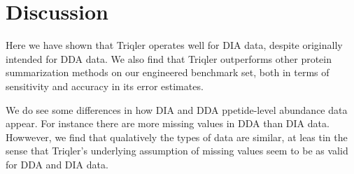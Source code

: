 \documentclass[10pt,letterpaper]{article}
\begin{document}

\section*{Discussion}

Here we have shown that Triqler operates well for DIA data, despite originally intended for DDA data. We also find that Triqler outperforms other protein summarization methods on our engineered benchmark set, both in terms of sensitivity and accuracy in its error estimates.

We do see some differences in how DIA and DDA ppetide-level abundance data appear. For instance there are more missing values in DDA than DIA data. Howwever, we find that qualatively the types of data are similar, at leas tin the sense that Triqler's underlying assumption of missing values seem to be as valid for DDA and DIA data.
\end{document}
